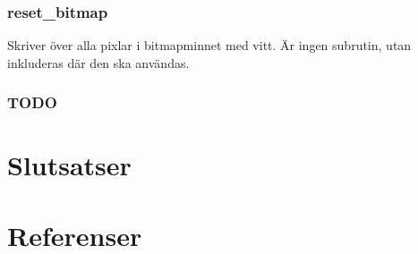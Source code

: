 \documentclass[]{article}
\begin{document}
\subsubsection{reset\_bitmap}
Skriver över alla pixlar i bitmapminnet med vitt. Är ingen subrutin, utan inkluderas där den ska användas.

\subsubsection{TODO}

\section{Slutsatser}
\section{Referenser}

\clearpage
\end{document}

